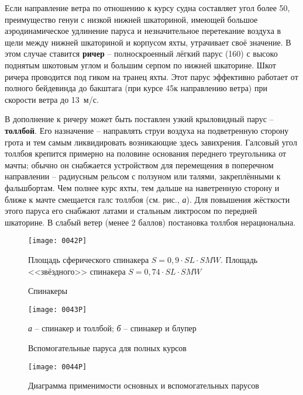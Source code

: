 Если направление ветра по отношению к курсу судна составляет угол
более 50\gr, преимущество генуи с низкой нижней шкаториной, имеющей
большое аэродинамическое удлинение паруса и незначительное перетекание
воздуха в щели между нижней шкаториной и корпусом яхты, утрачивает
своё значение. В этом случае ставится
\textbf{ричер} \--- полноскроенный
лёгкий парус (160\gmsq) с высоко поднятым шкотовым углом и
большим серпом по нижней шкаторине. Шкот ричера проводится под гиком
на транец яхты. Этот парус эффективно работает от полного бейдевинда
до бакштага (при курсе 45\gr к направлению ветра) при
скорости ветра до 13~м/с.

В дополнение к ричеру может быть поставлен узкий крыловидный парус
\--- \textbf{толлбой}. Его
назначение \--- направлять струи воздуха на подветренную сторону грота
и тем самым ликвидировать возникающие здесь завихрения. Галсовый угол
толлбоя крепится примерно на половине основания переднего треугольника
от мачты; обычно он снабжается устройством для перемещения в
поперечном направлении \--- радиусным рельсом с ползуном или талями,
закреплёнными к фальшбортам. Чем полнее курс яхты, тем дальше на
наветренную сторону и ближе к мачте смещается галс толлбоя
(см. рис., \textit{а}). Для повышения жёсткости этого паруса
его снабжают латами и стальным ликтросом по передней шкаторине. В
слабый ветер (менее 2 баллов) постановка толлбоя нерациональна.

\begin{figure}[htb]
  \centering{}
  \texttt{[image: 0042P]}
  \caption{Спинакеры}
  \label{fig:42}
  \small
  \centering{}
  Площадь сферического спинакера $S = 0,9 \cdot SL \cdot SMW$. Площадь <<звёздного>> спинакера $ S = 0,74 \cdot SL \cdot SMW$
\end{figure}

\begin{figure*}[htb]
  \centering{}
  \texttt{[image: 0043P]}
  \caption{Вспомогательные паруса для полных курсов}
  \label{fig:43}
  \small
  \centering{}
  \textit{а} \--- спинакер и толлбой; \textit{б} \--- спинакер и блупер
\end{figure*}

\begin{figure}[htb]
  \centering{}
  \texttt{[image: 0044P]}
  \caption{Диаграмма применимости основных и вспомогательных парусов}
  \label{fig:44}
\end{figure}

